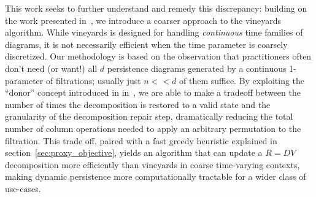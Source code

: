 \documentclass{siamart190516}
\begin{document}
This work seeks to further understand and remedy this discrepancy: building on the work presented in~\cite{busaryev2010tracking}, we introduce a coarser approach to the vineyards algorithm.
While vineyards is  designed  for handling   \emph{continuous} time families of diagrams, it is not necessarily efficient when the time parameter is coarsely discretized.
Our methodology is based on the observation that practitioners often don't need (or want!) all $d$ persistence diagrams generated by a continuous 1-parameter of filtrations; usually just $n << d$ of them  suffice.   
By exploiting the ``donor'' concept introduced in in~\cite{busaryev2010tracking}, we are able to make a tradeoff between the number of times the decomposition is restored to a valid state and the granularity of the decomposition repair step, dramatically reducing the total number of column operations needed to apply an arbitrary permutation to the filtration. This trade off, paired with a fast greedy heuristic explained in section~\ref{sec:proxy_objective}, yields an algorithm that can update a $R = DV$ decomposition more efficiently than vineyards in coarse time-varying contexts, making dynamic persistence more computationally tractable for a wider class of use-cases. 


 
\end{document}

